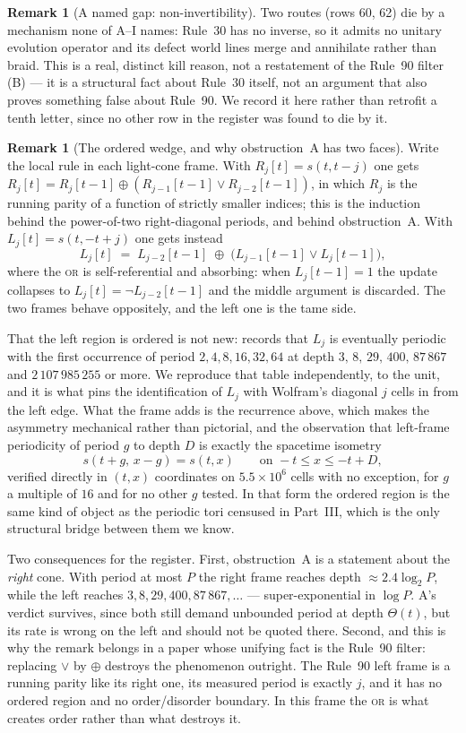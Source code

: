 \documentclass[11pt]{article}
\theoremstyle{definition}
\newtheorem{remark}[theorem]{Remark}
\begin{document}
\begin{remark}[A named gap: non-invertibility]
Two routes (rows 60, 62) die by a mechanism none of A--I names: Rule~30 has no
inverse, so it admits no unitary evolution operator and its defect world lines
merge and annihilate rather than braid. This is a real, distinct kill reason,
not a restatement of the Rule~90 filter (B) --- it is a structural fact about
Rule~30 itself, not an argument that also proves something false about
Rule~90. We record it here rather than retrofit a tenth letter, since no other
row in the register was found to die by it.
\end{remark}

\begin{remark}[The ordered wedge, and why obstruction~A has two faces]
\label{rem:wedge}
Write the local rule in each light-cone frame. With $R_j[t]=s(t,t-j)$ one gets
$R_j[t]=R_j[t-1]\oplus(R_{j-1}[t-1]\vee R_{j-2}[t-1])$, in which $R_j$ is the
running parity of a function of strictly smaller indices; this is the induction
behind the power-of-two right-diagonal periods, and behind obstruction~A. With
$L_j[t]=s(t,-t+j)$ one gets instead
\[
  L_j[t]\;=\;L_{j-2}[t-1]\;\oplus\;\bigl(L_{j-1}[t-1]\vee L_j[t-1]\bigr),
\]
where the \textsc{or} is self-referential and absorbing: when $L_j[t-1]=1$ the
update collapses to $L_j[t]=\neg L_{j-2}[t-1]$ and the middle argument is
discarded. The two frames behave oppositely, and the left one is the tame side.

That the left region is ordered is not new: \cite[p.~871]{nks} records that
$L_j$ is eventually periodic with the first occurrence of period
$2,4,8,16,32,64$ at depth $3,\,8,\,29,\,400,\,87\,867$ and $2\,107\,985\,255$ or
more. We reproduce that table independently, to the unit, and it is what pins
the identification of $L_j$ with Wolfram's diagonal $j$ cells in from the left
edge. What the frame adds is the recurrence above, which makes the asymmetry
mechanical rather than pictorial, and the observation that left-frame
periodicity of period $g$ to depth $D$ is exactly the spacetime isometry
\[
  s(t+g,\,x-g)=s(t,x)\qquad\text{on } -t\le x\le -t+D,
\]
verified directly in $(t,x)$ coordinates on $5.5\times10^{6}$ cells with no
exception, for $g$ a multiple of $16$ and for no other $g$ tested. In that form
the ordered region is the same kind of object as the periodic tori censused in
Part~III, which is the only structural bridge between them we know.

Two consequences for the register. First, obstruction~A is a statement about the
\emph{right} cone. With period at most $P$ the right frame reaches depth
$\approx 2.4\log_2 P$, while the left reaches $3,8,29,400,87\,867,\ldots$ ---
super-exponential in $\log P$. A's verdict survives, since both still demand
unbounded period at depth $\Theta(t)$, but its rate is wrong on the left and
should not be quoted there. Second, and this is why the remark belongs in a
paper whose unifying fact is the Rule~90 filter: replacing $\vee$ by $\oplus$
destroys the phenomenon outright. The Rule~90 left frame is a running parity
like its right one, its measured period is exactly $j$, and it has no ordered
region and no order/disorder boundary. In this frame the \textsc{or} is what
creates order rather than what destroys it.


\end{remark}
\end{document}
